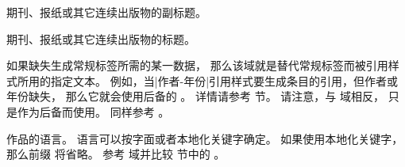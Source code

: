 \begin{fieldlist}



期刊、报纸或其它连续出版物的副标题。




期刊、报纸或其它连续出版物的标题。




如果缺失生成常规标签所需的某一数据，
那么该域就是替代常规标签而被引用样式所用的指定文本。
例如，当|作者-年份|引用样式要生成条目的引用，但作者或年份缺失，
那么它就会使用后备的 。
详情请参考  节。
请注意，与  域相反， 只是作为后备而使用。
同样参考 。




作品的语言。
语言可以按字面或者本地化关键字确定。
如果使用本地化关键字，那么前缀  将省略。
参考  域并比较  节中的 。




\end{fieldlist}
